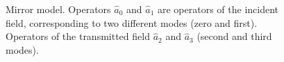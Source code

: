 \begin{figure}
\centering



\caption{Mirror model. Operators $\hat{a}_0$ and 
$\hat{a}_1$ are operators of the incident field, corresponding to two different modes
(zero and first). Operators of the transmitted field $\hat{a}_2$ and 
$\hat{a}_3$ (second and third modes).}
\label{figPart2Interfero_2}
\end{figure}